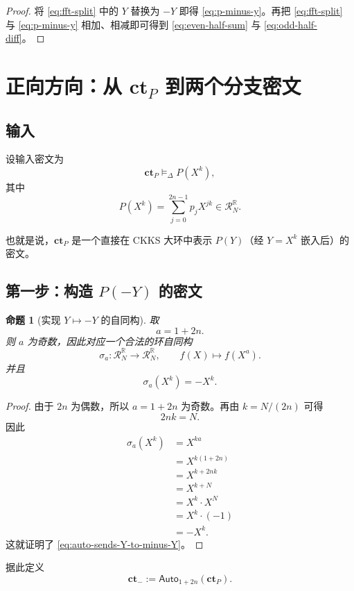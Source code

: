 \documentclass[11pt,a4paper]{ctexart}
\newcommand{\RR}{\mathbb{R}}
\newcommand{\Auto}[1]{\mathsf{Auto}_{#1}}
\newcommand{\ct}{\mathbf{ct}}
\newcommand{\Rbig}{\mathcal{R}_N^{\RR}}
\newcommand{\rep}{\mathrel{\vDash_{\Delta}}}
\newtheorem{proposition}[definition]{命题}
\begin{document}
\begin{proof}
将 \eqref{eq:fft-split} 中的 \(Y\) 替换为 \(-Y\) 即得 \eqref{eq:p-minus-y}。再把 \eqref{eq:fft-split} 与 \eqref{eq:p-minus-y} 相加、相减即可得到 \eqref{eq:even-half-sum} 与 \eqref{eq:odd-half-diff}。
\end{proof}

\section{正向方向：从 \texorpdfstring{\(\ct_P\)}{ctP} 到两个分支密文}

\subsection{输入}

设输入密文为
\[
\ct_P \rep P(X^k),
\]
其中
\[
P(X^k)=\sum_{j=0}^{2n-1}p_jX^{jk}\in \Rbig.
\]

也就是说，\(\ct_P\) 是一个直接在 CKKS 大环中表示 \(P(Y)\)（经 \(Y=X^k\) 嵌入后）的密文。

\subsection{第一步：构造 \texorpdfstring{\(P(-Y)\)}{P(-Y)} 的密文}

\begin{proposition}[实现 \(Y\mapsto -Y\) 的自同构]
取
\[
a=1+2n.
\]
则 \(a\) 为奇数，因此对应一个合法的环自同构
\[
\sigma_a:\Rbig\to\Rbig,\qquad f(X)\mapsto f(X^a).
\]
并且
\begin{equation}
\sigma_a(X^k)=-X^k. \label{eq:auto-sends-Y-to-minus-Y}
\end{equation}
\end{proposition}

\begin{proof}
由于 \(2n\) 为偶数，所以 \(a=1+2n\) 为奇数。再由 \(k=N/(2n)\) 可得
\[
2nk=N.
\]
因此
\begin{align*}
\sigma_a(X^k)
&=X^{ka}\\
&=X^{k(1+2n)}\\
&=X^{k+2nk}\\
&=X^{k+N}\\
&=X^k\cdot X^N\\
&=X^k\cdot(-1)\\
&=-X^k.
\end{align*}
这就证明了 \eqref{eq:auto-sends-Y-to-minus-Y}。
\end{proof}

据此定义
\begin{equation}
\ct_{-}:=\Auto{1+2n}(\ct_P). \label{eq:def-ct-minus}
\end{equation}
\end{document}
